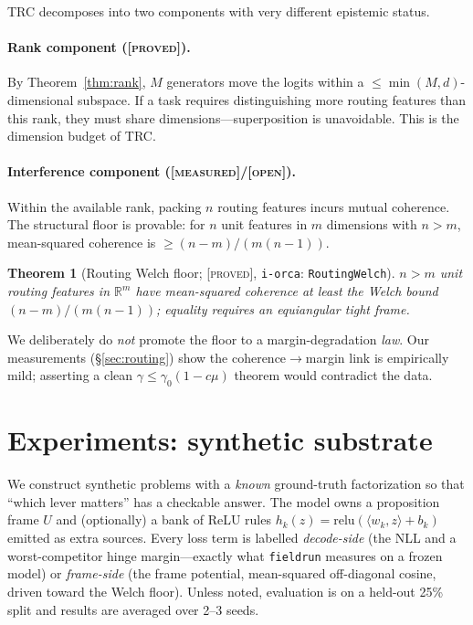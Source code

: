 \documentclass[sigconf,nonacm]{acmart}
\newtheorem{theorem}{Theorem}
\theoremstyle{definition}
\newcommand{\R}{\mathbb{R}}
\newcommand{\inner}[2]{\langle #1, #2\rangle}
\newcommand{\proved}{\textsc{[proved]}}
\newcommand{\measured}{\textsc{[measured]}}
\newcommand{\open}{\textsc{[open]}}
\begin{document}
TRC decomposes into two components with very different epistemic status.

\paragraph{Rank component (\proved).}
By Theorem~\ref{thm:rank}, $M$ generators move the logits within a
$\le\min(M,d)$-dimensional subspace. If a task requires distinguishing more
routing features than this rank, they must share dimensions---superposition is
unavoidable. This is the dimension budget of TRC.

\paragraph{Interference component (\measured/\open).}
Within the available rank, packing $n$ routing features incurs mutual coherence.
The structural floor is provable: for $n$ unit features in $m$ dimensions with
$n>m$, mean-squared coherence is $\ge(n-m)/(m(n-1))$.

\begin{theorem}[Routing Welch floor; \proved, \texttt{i-orca}: \texttt{RoutingWelch}]
\label{thm:welch}
$n>m$ unit routing features in $\R^m$ have mean-squared coherence at least the Welch
bound $(n-m)/(m(n-1))$; equality requires an equiangular tight frame.
\end{theorem}

We deliberately do \emph{not} promote the floor to a margin-degradation
\emph{law}. Our measurements (\S\ref{sec:routing}) show the coherence$\to$margin
link is empirically mild; asserting a clean $\gamma\le\gamma_0(1-c\mu)$ theorem would
contradict the data.

\smallskip
\noindent{}
\smallskip

\section{Experiments: synthetic substrate}
\label{sec:synthetic}

We construct synthetic problems with a \emph{known} ground-truth factorization so
that ``which lever matters'' has a checkable answer. The model owns a proposition
frame $U$ and (optionally) a bank of ReLU rules $h_k(z)=\mathrm{relu}(\inner{w_k}{z}+b_k)$
emitted as extra sources. Every loss term is labelled \emph{decode-side} (the NLL
and a worst-competitor hinge margin---exactly what \texttt{fieldrun} measures on a
frozen model) or \emph{frame-side} (the frame potential, mean-squared off-diagonal
cosine, driven toward the Welch floor). Unless noted, evaluation is on a held-out
25\% split and results are averaged over 2--3 seeds.
\end{document}
